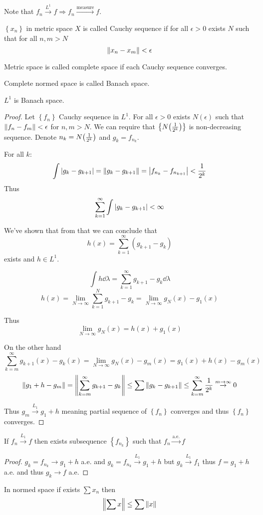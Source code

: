 Note that $f_n\stackrel{L^1}{\to} f \Rightarrow f_n\stackrel{\text{measure}}{\to} f$.

\begin{definition}
	$\left\{x_n\right\}$ in metric space $X$ is called Cauchy sequence if for all $\epsilon>0$ exists $N$ such that for all $n,m>N$
	$$\norm{x_n-x_m} < \epsilon$$
\end{definition}

\begin{definition}
	Metric space is called complete space if each Cauchy sequence converges.
\end{definition}
\begin{definition}
	Complete normed space is called Banach space.
\end{definition}
\begin{theorem}
	$L^1$ is Banach space.
	\begin{proof}
		Let $\left\{ f_n \right\}$ Cauchy sequence in $L^1$. For all $\epsilon>0$ exists $N(\epsilon)$ such that $\norm{f_n-f_m}<\epsilon$ for $n,m>N$. We can require that $\left\{ N\qty(\frac{1}{2^k}) \right\}$ is non-decreasing sequence.
		Denote $n_k = N\qty(\frac{1}{2^k})$ and $g_k = f_{n_k}$.
		
		For all $k$:
		$$\int \abs{g_k-g_{k+1} } = \norm{g_k-g_{k+1}} = \abs{f_{n_k} - f_{n_{k+1}}} < \frac{1}{2^k}$$
		Thus
		$$\sum_{k=1}^\infty \int \abs{g_k-g_{k+1} } < \infty$$
		
		We've shown that from that we can conclude that
		$$h(x) = \sum_{k=1}^\infty (g_{k+1}-g_k)$$
		exists and $h\in L^1$.
		
		$$\int h\dd{\lambda} = \sum_{k=1}^\infty g_{k+1}-g_k \dd{\lambda}$$
		$$h(x) = \lim_{N\to \infty} \sum_{k=1}^N  g_{k+1}-g_k = \lim_{N\to \infty} g_N(x) - g_1(x)$$
		
		Thus
		$$\lim_{N\to \infty} g_N(x) = h(x) + g_1(x)$$
		
		On the other hand
		$$\sum_{k=m}^\infty g_{k+1}(x)- g_k(x) =\lim_{N\to \infty} g_N(x) - g_m(x) = g_1(x) + h(x) - g_m(x) $$
		$$\norm{g_1+h-g_m} = \norm{\sum_{k=m}^\infty g_{k+1} - g_k} \leq \sum \norm{g_k-g_{k+1}}\leq \sum_{k=m}^\infty \frac{1}{2^k} \stackrel{m\to \infty}{\to} 0$$
		
		Thus $g_m \stackrel{L_1}{\to} g_1+h$ meaning partial sequence of $\left\{f_n\right\}$ converges and thus  $\left\{f_n\right\}$ converges.
	\end{proof}

\begin{coll}
	If $f_n \stackrel{L_1}{\to}  f$ then exists subsequence $\left\{ f_{n_k} \right\}$ such that $f_n \stackrel{\text{a.e.}}{\to}  f$ 
	\begin{proof}
		$g_k = f_{n_{k}} \to g_1+h$ a.e. and $g_k = f_{n_k} \stackrel{L_1}{\to}  g_1+h$  but $g_k \stackrel{L_1}{\to}  f_1$ thus $f=g_1+h$ a.e. and thus $g_k\to f$ a.e.
	\end{proof}
\end{coll}
\end{theorem}

\begin{prop}
	In normed space if exists $\sum x_n$ then
	$$\norm{\sum x} \leq \sum \norm{x}$$
\end{prop}
